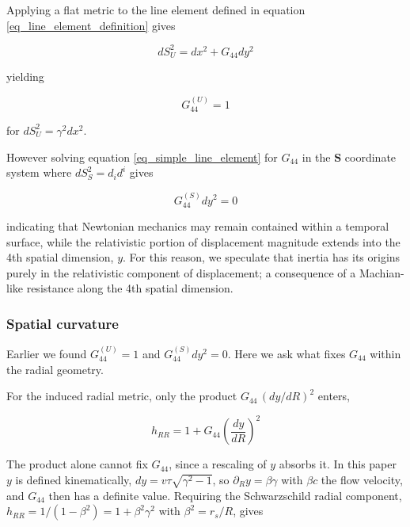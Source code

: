 \documentclass[pdflatex,sn-mathphys-num]{sn-jnl}%
\theoremstyle{thmstyleone}%
\theoremstyle{thmstyletwo}%
\theoremstyle{thmstylethree}%
\begin{document}
Applying a flat metric to the line element defined in equation \ref{eq_line_element_definition} gives

\begin{equation}\label{eq_simple_line_element}
    dS^{2}_{U} = dx^{2} + G_{44} dy^{2}
\end{equation}

yielding

\begin{equation}
    \boxed{
        G_{44}^{\left( U \right)} = 1
    }
\end{equation}

for $dS^{2}_{U} = \gamma^{2} dx^{2}$.

However solving equation \ref{eq_simple_line_element} for $G_{44}$ in the $\mathbf{S}$ coordinate system where $dS^{2}_{S} = d_{i} d^{i}$ gives

\begin{equation}
    \boxed{
        G_{44}^{\left( S \right)} dy^{2} = 0
    }
\end{equation}

indicating that Newtonian mechanics may remain contained within a temporal surface, while the relativistic portion of displacement magnitude extends into the 4th spatial dimension, $y$. For this reason, we speculate that inertia has its origins purely in the relativistic component of displacement; a consequence of a Machian-like resistance along the 4th spatial dimension.
 
\subsubsection{Spatial curvature}
 
Earlier we found $G_{44}^{(U)}=1$ and $G_{44}^{(S)}dy^2=0$. Here we ask what fixes $G_{44}$ within the radial geometry.

For the induced radial metric, only the product $G_{44}\,(dy/dR)^2$ enters,
 
\begin{equation}
    h_{RR}=1+G_{44}\left(\frac{dy}{dR}\right)^2
\end{equation}
 
The product alone cannot fix $G_{44}$, since a rescaling of $y$ absorbs it. In this paper $y$ is defined kinematically, $dy=v\tau\sqrt{\gamma^2-1}$, so $\partial_R y=\beta\gamma$ with $\beta c$ the flow velocity, and $G_{44}$ then has a definite value. Requiring the Schwarzschild radial component, $h_{RR}=1/(1-\beta^2)=1+\beta^2\gamma^2$ with $\beta^2=r_s/R$, gives
 
\end{document}
